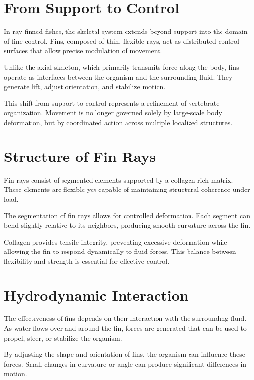 \documentclass[11pt,oneside]{book}
\begin{document}
\section{From Support to Control}

In ray-finned fishes, the skeletal system extends beyond support into the domain of fine control. Fins, composed of thin, flexible rays, act as distributed control surfaces that allow precise modulation of movement.

Unlike the axial skeleton, which primarily transmits force along the body, fins operate as interfaces between the organism and the surrounding fluid. They generate lift, adjust orientation, and stabilize motion.

This shift from support to control represents a refinement of vertebrate organization. Movement is no longer governed solely by large-scale body deformation, but by coordinated action across multiple localized structures.

\section{Structure of Fin Rays}

Fin rays consist of segmented elements supported by a collagen-rich matrix. These elements are flexible yet capable of maintaining structural coherence under load.

The segmentation of fin rays allows for controlled deformation. Each segment can bend slightly relative to its neighbors, producing smooth curvature across the fin.

Collagen provides tensile integrity, preventing excessive deformation while allowing the fin to respond dynamically to fluid forces. This balance between flexibility and strength is essential for effective control.

\section{Hydrodynamic Interaction}

The effectiveness of fins depends on their interaction with the surrounding fluid. As water flows over and around the fin, forces are generated that can be used to propel, steer, or stabilize the organism.

By adjusting the shape and orientation of fins, the organism can influence these forces. Small changes in curvature or angle can produce significant differences in motion.
\end{document}
